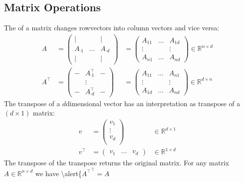 \documentclass[letterpaper,10pt,english]{jupyterBook}
\begin{document}
\subsection{Matrix Operations}
\label{\detokenize{linalg_spaces:matrix-operations}}
\sphinxAtStartPar
The  of a matrix changes row\sphinxhyphen{}vectors into column vectors and vice versa:
\begin{align*}
    A&= \begin{pmatrix}
        \vert & & \vert\\
       A_{\cdot 1}&\ldots & A_{\cdot d}\\
\vert & & \vert
\end{pmatrix}
&=\begin{pmatrix}
        A_{11 } & \ldots& A_{1d}\\
       \vdots& & \vdots\\
A_{n1} &\ldots & A_{nd} 
\end{pmatrix}\in\mathbb{R}^{n\times d}\\
A^\top&= \begin{pmatrix}
        - & A_{\cdot 1}^\top & -\\
       &\vdots & \\
 -&A_{\cdot d}^\top &- 
\end{pmatrix}
&=\begin{pmatrix}
        A_{11 } & \ldots& A_{n1}\\
       \vdots& & \vdots\\
A_{1d} &\ldots & A_{nd} 
\end{pmatrix}\in\mathbb{R}^{d\times n}
\end{align*}
\sphinxAtStartPar
The transpose of a \(d\)\sphinxhyphen{}dimensional vector has an interpretation as transpose of a \((d\times 1)\) matrix:
\begin{align*}
    v&= \begin{pmatrix}
        v_1\\
        \vdots\\
        v_d\\
\end{pmatrix}
&\in\mathbb{R}^{d\times 1}\\
v^\top&= \begin{pmatrix}
        v_1 & \ldots & v_d
\end{pmatrix}&\in\mathbb{R}^{1\times d}
\end{align*}
\sphinxAtStartPar
The transpose of the transpose returns the original matrix.
For any matrix \(A\in\mathbb{R}^{n\times d}\) we have \textbackslash{}alert\{\({A^\top}^\top = A\)
\end{document}
